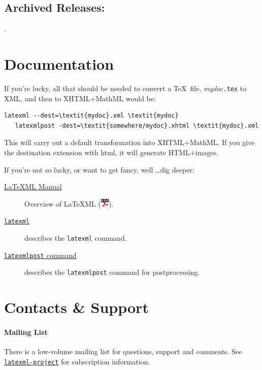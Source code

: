 \documentclass{article}
\newcommand{\PDFIcon}{\includegraphics{pdf}}
\begin{document}
\subsection{Archived Releases:}\label{archive}
\AllReleases.

\section{Documentation}\label{docs}
If you're lucky, all that should be needed to convert
a \TeX\ file, \textit{mydoc}\texttt{.tex} to XML, and
then to XHTML+MathML would be:
\begin{lstlisting}[style=shell]
   latexml --dest=\textit{mydoc}.xml \textit{mydoc}
   latexmlpost -dest=\textit{somewhere/mydoc}.xhtml \textit{mydoc}.xml
\end{lstlisting}
This will carry out a default transformation into XHTML+MathML.  If you
give the destination extension with html, it will generate HTML+images.

If you're not so lucky, or want to get fancy, well \ldots dig deeper:
\begin{description}
\item[\href{manual/index.xhtml}{LaTeXML Manual}]
    Overview of LaTeXML (\href{manual.pdf}{\PDFIcon}).
\item[\href{manual/commands/latexml.xhtml}{\texttt{latexml}}]
    describes the \texttt{latexml} command.
\item[\href{manual/commands/latexmlpost.xhtml}{\texttt{latexmlpost} command}]
   describes the \texttt{latexmlpost} command for postprocessing.
\end{description}


\section{Contacts \& Support}\label{contact}

\paragraph{Mailing List}
There is a low-volume mailing list for questions, support and comments.
See \href{http://lists.jacobs-university.de/mailman/listinfo/project-latexml}{\texttt{latexml-project}} for subscription information.
\end{document}
